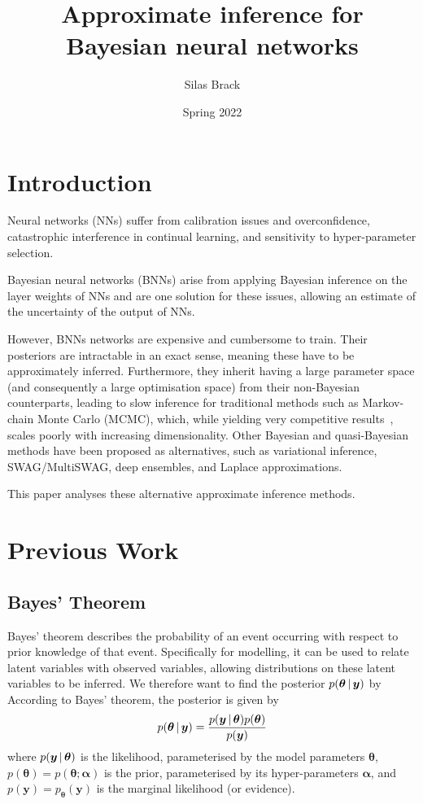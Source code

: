 \documentclass[10pt,a4paper,twocolumn]{article}
\title{\bfseries Approximate inference for Bayesian neural networks}
\author{Silas Brack}
\date{Spring 2022}
\begin{document}
\maketitle

\begin{abstract}
\end{abstract}

\section{Introduction}

Neural networks (NNs) suffer from calibration issues and overconfidence, catastrophic interference in continual learning, and sensitivity to hyper-parameter selection.

Bayesian neural networks (BNNs) arise from applying Bayesian inference on the layer weights of NNs and are one solution for these issues, allowing an estimate of the uncertainty of the output of NNs.

However, BNNs networks are expensive and cumbersome to train.
Their posteriors are intractable in an exact sense, meaning these have to be approximately inferred.
Furthermore, they inherit having a large parameter space (and consequently a large optimisation space) from their non-Bayesian counterparts, leading to slow inference for traditional methods such as Markov-chain Monte Carlo (MCMC), which, while yielding very competitive results~\cite{izmailov2021bayesian}, scales poorly with increasing dimensionality.
Other Bayesian and quasi-Bayesian methods have been proposed as alternatives, such as variational inference, SWAG/MultiSWAG, deep ensembles, and Laplace approximations.

This paper analyses these alternative approximate inference methods.

\section{Previous Work}\label{sec:priorwork}

\subsection{Bayes’ Theorem}

Bayes' theorem describes the probability of an event occurring with respect to prior knowledge of that event.
Specifically for modelling, it can be used to relate latent variables with observed variables, allowing distributions on these latent variables to be inferred.
We therefore want to find the posterior \(p(\bm \theta \, | \, \bm y)\) by
According to Bayes' theorem, the posterior is given by
\begin{align}\label{eq:bayes}
    p(\bm \theta \, | \, \bm y) = \frac{p(\bm y \, | \, \bm \theta) p(\bm \theta)}{p(\bm y)}
\end{align}
where \(p(\bm y \, | \, \bm \theta)\) is the likelihood, parameterised by the model parameters \(\bm \theta\), \(p(\bm \theta) = p(\bm \theta; \bm \alpha)\) is the prior, parameterised by its hyper-parameters \(\bm \alpha\), and \(p(\bm y) = p_{\bm \theta}(\bm y)\) is the marginal likelihood (or evidence).
\end{document}
